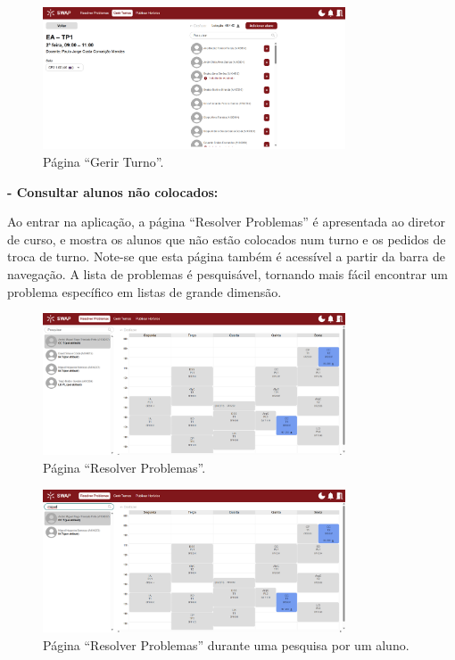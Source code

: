 \documentclass[12pt, a4paper]{article}
\begin{document}
\begin{figure}[H]
    \centering
    \includegraphics[width=0.8\textwidth]{res/manual/gerir_turno.png}
    \caption{Página ``Gerir Turno''.}
    \label{gerir_turno}
\end{figure}

\textbf{- Consultar alunos não colocados:}

Ao entrar na aplicação, a página ``Resolver Problemas'' é apresentada ao diretor de curso, e mostra
os alunos que não estão colocados num turno e os pedidos de troca de turno. Note-se que esta página
também é acessível a partir da barra de navegação. A lista de problemas é pesquisável, tornando mais
fácil encontrar um problema específico em listas de grande dimensão.

\begin{figure}[H]
    \centering
    \includegraphics[width=0.8\textwidth]{res/manual/resolver_problemas.png}
    \caption{Página ``Resolver Problemas''.}
    \label{resolver_problemas}
\end{figure}

\begin{figure}[H]
    \centering
    \includegraphics[width=0.8\textwidth]{res/manual/resolver_problemas_pesquisar.png}
    \caption{Página ``Resolver Problemas'' durante uma pesquisa por um aluno.}
    \label{resolver_problemas_pesquisa}
\end{figure}
\end{document}
